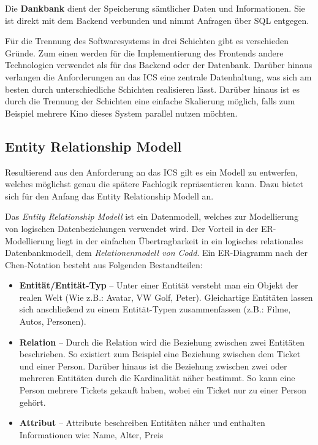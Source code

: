 		Die \textbf{Dankbank} dient der Speicherung sämtlicher Daten und Informationen. Sie ist direkt mit dem Backend verbunden und nimmt Anfragen über SQL entgegen. 
		
		Für die Trennung des Softwaresystems in drei Schichten gibt es verschieden Gründe. Zum einen werden für die Implementierung des Frontends andere Technologien verwendet als für das Backend oder der Datenbank. Darüber hinaus verlangen die Anforderungen an das \ac{ICS} eine zentrale Datenhaltung, was sich am besten durch unterschiedliche Schichten realisieren lässt. Darüber hinaus ist es durch die Trennung der Schichten eine einfache Skalierung möglich, falls zum Beispiel mehrere Kino dieses System parallel nutzen möchten.
		\subsection{Entity Relationship Modell}\label{chapter:er-diagramm}
		Resultierend aus den Anforderung an das \ac{ICS} gilt es ein Modell zu entwerfen, welches möglichst genau die spätere Fachlogik repräsentieren kann. Dazu bietet sich für den Anfang das \glqq Entity Relationship Modell\grqq{} an.
		
		Das \textit{\glqq Entity Relationship Modell\grqq{}} ist ein Datenmodell, welches zur Modellierung von logischen Datenbeziehungen verwendet wird. Der Vorteil in der ER-Modellierung liegt in der einfachen Übertragbarkeit in ein logisches relationales Datenbankmodell, dem \textit{Relationenmodell von Codd}. Ein ER-Diagramm nach der Chen-Notation besteht aus Folgenden Bestandteilen:\autocite[Vgl.][]{Stobitzer.0130201914:40Uhr}
		\begin{itemize}
			\item \textbf{Entität/Entität-Typ} -- Unter einer Entität versteht man ein Objekt der realen Welt (Wie z.B.: Avatar, VW Golf, Peter). Gleichartige Entitäten lassen sich anschließend zu einem Entität-Typen zusammenfassen (z.B.: Filme, Autos, Personen).\autocite[Vgl.][]{Stobitzer.0130201914:40Uhr} 
			\item \textbf{Relation} -- Durch die Relation wird die Beziehung zwischen zwei Entitäten beschrieben. So existiert zum Beispiel eine Beziehung zwischen dem Ticket und einer Person. Darüber hinaus ist die Beziehung zwischen zwei oder mehreren Entitäten durch die Kardinalität näher bestimmt. So kann eine Person mehrere Tickets gekauft haben, wobei ein Ticket nur zu einer Person gehört.\autocite[Vgl.][]{Stobitzer.0130201914:40Uhr}
			\item \textbf{Attribut} -- Attribute beschreiben Entitäten näher und enthalten Informationen wie: Name, Alter, Preis
		\end{itemize}
		
